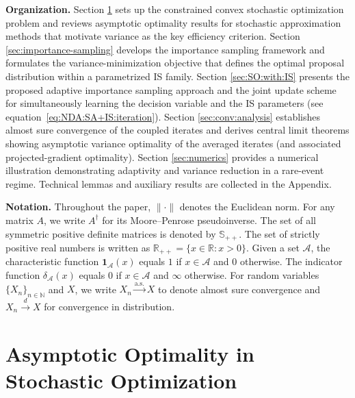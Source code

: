 \documentclass[11pt,a4paper]{article}
\theoremstyle{definition}
\begin{document}
\noindent\textbf{Organization.}
Section \ref{sec:sa:with:is} sets up the constrained convex stochastic optimization problem and reviews asymptotic optimality results for stochastic approximation methods that motivate variance as the key efficiency criterion. Section \ref{sec:importance-sampling} develops the importance sampling framework and formulates the variance-minimization objective that defines the optimal proposal distribution within a parametrized IS family. Section \ref{sec:SO:with:IS} presents the proposed adaptive importance sampling approach and the joint update scheme for simultaneously learning the decision variable and the IS parameters (see equation~\eqref{eq:NDA:SA+IS:iteration}). Section \ref{sec:conv:analysis} establishes almost sure convergence of the coupled iterates and derives central limit theorems showing asymptotic variance optimality of the averaged iterates (and associated projected-gradient optimality). Section \ref{sec:numerics} provides a numerical illustration demonstrating adaptivity and variance reduction in a rare-event regime. Technical lemmas and auxiliary results are collected in the Appendix.

\medskip

\noindent\textbf{Notation.} Throughout the paper, $\|\cdot\|$ denotes the Euclidean norm. For any matrix $A$, we write $A^\dagger$ for its Moore–Penrose pseudoinverse. The set of all symmetric positive definite matrices is denoted by $\mathbb{S}_{++}$. The set of strictly positive real numbers is written as $\mathbb{R}_{++} = \{x \in \mathbb{R}: x > 0\}$. Given a set $\mathcal{A}$, the characteristic function $\mathbf{1}_{\mathcal{A}}(x)$ equals $1$ if $x \in \mathcal{A}$ and $0$ otherwise. The indicator function $\delta_{\mathcal{A}}(x)$ equals $0$ if $x \in \mathcal{A}$ and $\infty$ otherwise. For random variables $\{X_n\}_{n \in \mathbb{N}}$ and $X$, we write $X_n \overset{\text{a.s.}}{\to} X$ to denote almost sure convergence and $X_n \overset{d}{\to} X$ for convergence in distribution.



\section{Asymptotic Optimality in Stochastic Optimization}
\label{sec:sa:with:is}
\end{document}
